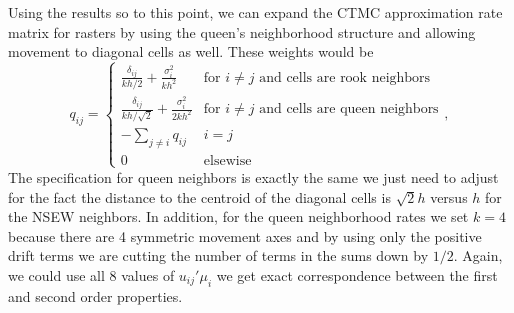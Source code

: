 \documentclass[12pt]{article}
\begin{document}
Using the results so to this point, we can expand the CTMC approximation rate matrix for rasters by using the queen's neighborhood structure and allowing movement to diagonal cells as well. These weights would be $$
q_{ij} = \left\{
\begin{array}{ll}
\frac{\delta_{ij}}{kh/2} + \frac{\sigma^2_i}{kh^2} & \text{for } i\ne j \text{ and cells are rook neighbors} \\
\frac{\delta_{ij}}{kh/\sqrt{2}} + \frac{\sigma^2_i}{2kh^2} & \text{for } i\ne j \text{ and cells are queen neighbors} \\
-\sum_{j\ne i} q_{ij} & i = j \\
0 & \text{elsewise}
\end{array}
\right.,
$$ The specification for queen neighbors is exactly the same we just need to adjust for the fact the distance to the centroid of the diagonal cells is $\sqrt{2}h$ versus $h$ for the NSEW neighbors. In addition, for the queen neighborhood rates we set $k=4$ because there are 4 symmetric movement axes and by using only the positive drift terms we are cutting the number of terms in the sums down by $1/2$. Again, we could use all 8 values of $u_{ij}'\mu_i$ we get exact correspondence between the first and second order properties.
\end{document}
